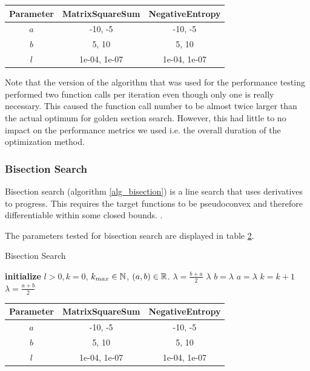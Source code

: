 \documentclass[a4paper,english,titlepage,12pt]{article}
\newcommand{\abs}[1]{\ensuremath|#1|}
\newcommand{\R}{\ensuremath\mathbb{R}}
\newcommand{\N}{\ensuremath\mathbb{N}}
\begin{document}
\begin{table}[H]
\label{tab:params_GoldenSectionSearch}
\centering
{}
\begin{tabular}{|c|c|c|}
\hline
\rowcolor{gray!25}
Parameter & MatrixSquareSum & NegativeEntropy \\
\hline
$a$ & -10, -5 & -10, -5 \\
$b$ & 5, 10 & 5, 10 \\
$l$ & 1e-04, 1e-07 & 1e-04, 1e-07 \\
\hline
\end{tabular}
\end{table}


Note that the version of the algorithm that was used for the performance testing performed two function calls per iteration even though only one is really necessary. This caused the function call number to be almost twice larger than the actual optimum for golden section search. However, this had little to no impact on the performance metrics we used i.e. the overall duration of the optimization method.


\subsubsection{Bisection Search}


Bisection search (algorithm \ref{alg_bisection}) is a line search that uses derivatives to progress. This requires the target functions to be pseudoconvex and therefore differentiable within some closed bounds. \cite{book:nonlinear_programming}.

The parameters tested for bisection search are displayed in table \ref{tab:params_BisectionSearch}.

\begin{algorithm}[H]
\caption{Bisection Search}
\label{alg_bisection}
\begin{algorithmic}[1]
\STATE \textbf{initialize} $l > 0, k = 0$, $k_{max} \in \N$, $(a, b) \in \R$.
\WHILE{$\abs{b - a} > l$ \AND $k < k_{max}$}
    \STATE $\lambda = \frac{b + a}{2}$
        \RETURN $\lambda$
        \STATE $b = \lambda$
    \ELSE
        \STATE $a = \lambda$
    \ENDIF
    \STATE $k = k + 1$
\ENDWHILE
\RETURN $\lambda = \frac{a + b}{2}$
\end{algorithmic}
\end{algorithm}

\begin{table}[H]
\label{tab:params_BisectionSearch}
\centering
{}
\begin{tabular}{|c|c|c|}
\hline
\rowcolor{gray!25}
Parameter & MatrixSquareSum & NegativeEntropy \\
\hline
$a$ & -10, -5 & -10, -5 \\
$b$ & 5, 10 & 5, 10 \\
$l$ & 1e-04, 1e-07 & 1e-04, 1e-07 \\
\hline
\end{tabular}
\end{table}
\end{document}
